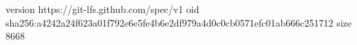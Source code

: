 version https://git-lfs.github.com/spec/v1
oid sha256:a4242a24f623a01f792e6e5fe4b6e2df979a4d0c0cb0571efc01ab666c251712
size 8668
